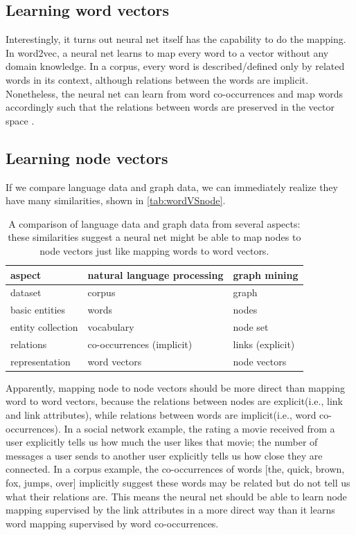\documentclass{article}
\begin{document}
\subsection{Learning word vectors}
Interestingly, it turns out neural net itself has the capability to do the 
mapping.
In word2vec, a neural net learns to map every word to a vector without any 
domain knowledge. In a corpus, every word is described/defined only by related 
words in its context, although relations between the words are implicit. 
Nonetheless, the neural net can learn from word co-occurrences and map words 
accordingly such that the relations between words are preserved in the vector 
space \cite{mikolov2013distributed}.

\subsection{Learning node vectors}
If we compare language data and graph data, we can immediately realize they 
have many similarities, shown in \autoref{tab:wordVSnode}.
\begin{table}[H]
	\centering
	\begin{tabularx}{\textwidth}{ |X|X|X| } \hline
		aspect  & natural language processing & graph mining \\ \hline
		dataset & corpus & graph \\ \hline
		basic entities & words & nodes \\ \hline
		entity collection & vocabulary & node set \\ \hline
		relations & co-occurrences (implicit) & links (explicit) \\ \hline
		representation & word vectors & node vectors \\ \hline
	\end{tabularx}
	\caption{A comparison of language data and graph data from 
		several aspects: these similarities suggest a neural net might be able 
		to map nodes to node vectors just like mapping words to word vectors.}
	\label{tab:wordVSnode}
\end{table}
Apparently, mapping node to node vectors should be more direct than mapping 
word to word vectors, because the relations between nodes are explicit(i.e., 
link and link attributes), while relations between words are implicit(i.e., 
word co-occurrences). In a social network example, the rating a movie received 
from a user explicitly tells us how much the user likes that movie; the number 
of messages a user sends to another user explicitly tells us how close they are 
connected. In a corpus example, the co-occurrences of words [the, quick, brown, 
fox, jumps, over] implicitly suggest these words may be related but do not tell 
us what their relations are. This means the neural net should be able to learn 
node mapping supervised by the link attributes in a more direct way than it 
learns word mapping supervised by word co-occurrences.
\end{document}
